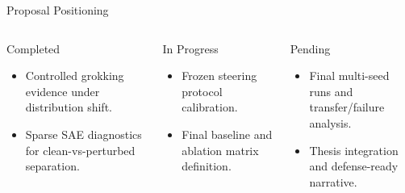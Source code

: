 \begin{frame}{Proposal Positioning}
    \begin{columns}[T,onlytextwidth]
        \begin{block}{Completed}
            \footnotesize
            \begin{itemize}
                \item Controlled grokking evidence under distribution shift.
                \item Sparse SAE diagnostics for clean-vs-perturbed separation.
            \end{itemize}
        \end{block}
        \begin{block}{In Progress}
            \footnotesize
            \begin{itemize}
                \item Frozen steering protocol calibration.
                \item Final baseline and ablation matrix definition.
            \end{itemize}
        \end{block}
        \begin{block}{Pending}
            \footnotesize
            \begin{itemize}
                \item Final multi-seed runs and transfer/failure analysis.
                \item Thesis integration and defense-ready narrative.
            \end{itemize}
        \end{block}
    \end{columns}
\end{frame}
